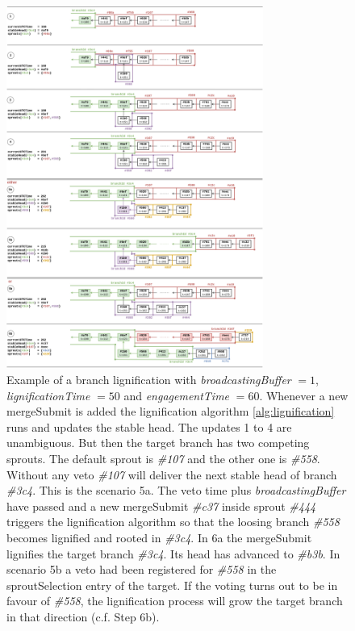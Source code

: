 \documentclass[14pt]{article}
\begin{document}
\begin{figure}[h!]
  \begin{center}
    \includegraphics[width=0.75\textwidth]{src/img/LignificationProcessV7.png}
\end{center}
 \caption{Example of a branch lignification with \textit{broadcastingBuffer} $=1$, \textit{lignificationTime} $=50$ and \textit{engagementTime} $=60$. Whenever a new mergeSubmit is added the lignification algorithm \ref{alg:lignification} runs and updates the stable head. The updates 1 to 4 are unambiguous. But then the target branch has two competing sprouts. The default sprout is \textit{\#107} and the other one is \textit{\#558}. Without any veto \textit{\#107} will deliver the next stable head of branch \textit{\#3c4}. This is the scenario 5a. The veto time plus \textit{broadcastingBuffer} have passed and a new mergeSubmit \textit{\#c37} inside sprout \textit{\#444} triggers the lignification algorithm so that the loosing branch \textit{\#558} becomes lignified and rooted in \textit{\#3c4}. In 6a the mergeSubmit lignifies the target branch \textit{\#3c4}. Its head has advanced to \textit{\#b3b}. In scenario 5b a veto had been registered for \textit{\#558} in the sproutSelection entry of the target. If the voting turns out to be in favour of \textit{\#558}, the lignification process will grow the target branch in that direction (c.f. Step 6b).}
 \label{fig:bufferbranches}
\end{figure}
\end{document}
